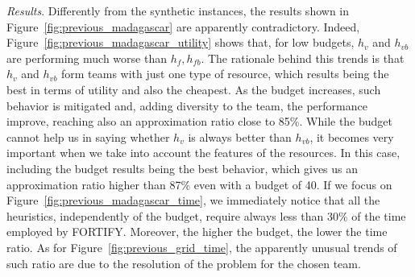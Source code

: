 \textit{Results}. Differently from the synthetic instances, the results shown in Figure~\ref{fig:previous_madagascar} are apparently contradictory. Indeed, Figure~\ref{fig:previous_madagascar_utility} shows that, for low budgets, $h_v$ and $h_{vb}$ are performing much worse than $h_f, h_{fb}$. The rationale behind this trends is that $h_v$ and $h_{vb}$ form teams with just one type of resource, which results being the best in terms of utility and also the cheapest. As the budget increases, such behavior is mitigated and, adding diversity to the team, the performance improve, reaching also an approximation ratio close to 85\%. While the budget cannot help us in saying whether $h_v$ is always better than $h_{vb}$, it becomes very important when we take into account the features of the resources. In this case, including the budget results being the best behavior, which gives us an approximation ratio higher than 87\% even with a budget of 40. If we focus on Figure~\ref{fig:previous_madagascar_time}, we immediately notice that all the heuristics, independently of the budget, require always less than 30\% of the time employed by FORTIFY. Moreover, the higher the budget, the lower the time ratio. As for Figure~\ref{fig:previous_grid_time}, the apparently unusual trends of such ratio are due to the resolution of the problem for the chosen team.





